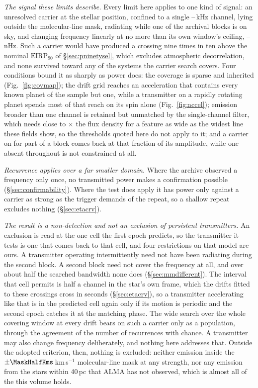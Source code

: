 \noindent\emph{The signal these limits describe.} Every limit here applies to
one kind of signal: an unresolved carrier at the stellar position, confined to
a single \ChanLoA--\ChanHiA\,kHz channel, lying outside the molecular-line
mask, radiating while one of the archival blocks is on sky, and changing
frequency linearly at no more than its own window's ceiling,
\DriftCeilLo--\DriftCeilHi\,nHz. Such a carrier would
have produced a crossing nine times in ten above the nominal
$\mathrm{EIRP}_{90}$ of \S\ref{sec:pninetysel}, which excludes atmospheric
decorrelation, and none survived toward any of the \NSysClassA{}
systems the carrier search covers. Four conditions
bound it as sharply as power does: the coverage is sparse and
inherited (Fig.~\ref{fig:covmap}); the drift grid reaches an acceleration that contains every
known planet of the sample but one, while a transmitter on a rapidly rotating
planet spends most of that reach on its spin alone (Fig.~\ref{fig:accel}); emission broader than one channel is
retained but unmatched by the single-channel filter, which needs close to
\ScNBroadRatio$\times$ the flux density for a feature as wide as the widest line these
fields show, so the thresholds quoted here do not apply to it; and a carrier on for part of a block comes
back at that fraction of its amplitude, while one absent throughout is not
constrained at all.

\noindent\emph{Recurrence applies over a far smaller domain.} Where the
archive observed a frequency only once, no transmitted power makes a
confirmation possible (\S\ref{sec:confirmability}). Where the test does apply
it has power only against a carrier as strong as the trigger demands of the
repeat, so a shallow repeat excludes nothing (\S\ref{sec:etacrv}).

\noindent\emph{The result is a non-detection and not an exclusion of
persistent transmitters.} An exclusion is read at the one cell the first
epoch predicts, so the transmitter it tests is one that comes back to that
cell, and four restrictions on that model are
ours. A transmitter operating intermittently need not have been radiating
during the second block. A second block need not cover the frequency at all,
and over about half the searched bandwidth none does
(\S\ref{sec:mmdifferent}). The interval that cell permits is half a channel in the star's own frame,
which the drifts fitted to these crossings cross in seconds
(\S\ref{sec:etacrv}), so a transmitter accelerating like that is in the
predicted cell again only if its motion is periodic and the second epoch
catches it at the matching phase. The wide search over the whole covering
window at every drift bears on such a carrier only as a population, through
the agreement of the number of recurrences with chance. A transmitter may also change frequency deliberately,
and nothing here addresses that. Outside the adopted criterion, then, nothing
is excluded: neither emission inside the
$\pm\MaskHalfKms$\,km\,s$^{-1}$ molecular-line mask at any strength, nor any
emission from the stars within 40\,pc that ALMA has not
observed, which is almost all of the \NGaiaCensus{} this volume holds.

